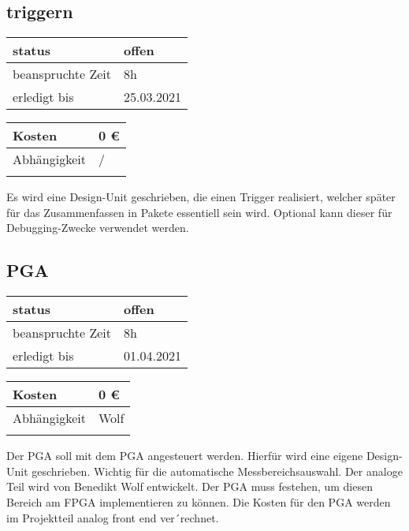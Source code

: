 \documentclass{scrartcl}
\begin{document}
\subsection{triggern}
\begin{tabular}[h]{|l|l|} %
	\hline
	status & offen\\
	\hline
	beanspruchte Zeit & 8h \\
	\hline
	erledigt bis & 25.03.2021 \\
	\hline
\end{tabular}
\begin{tabular}[h]{|l|l|} %
	\hline
	Kosten & 0 €\\
	\hline
	Abhängigkeit & /\\
	\hline
	 &  \\
	\hline
\end{tabular}
Es wird eine Design-Unit geschrieben, die einen Trigger realisiert, welcher später für das Zusammenfassen in Pakete essentiell sein wird. Optional kann dieser für Debugging-Zwecke verwendet werden. 
\subsection{PGA}
\begin{tabular}[h]{|l|l|} %
	\hline
	status & offen\\
	\hline
	beanspruchte Zeit & 8h \\
	\hline
	erledigt bis & 01.04.2021 \\
	\hline
\end{tabular}
\begin{tabular}[h]{|l|l|} %
	\hline
	Kosten & 0 €\\
	\hline
	Abhängigkeit & Wolf\\
	\hline
	 &  \\
	\hline
\end{tabular}
Der PGA soll mit dem PGA angesteuert werden. Hierfür wird eine eigene Design-Unit geschrieben. Wichtig für die automatische Messbereichsauswahl. Der analoge Teil wird von Benedikt Wolf entwickelt. Der PGA muss festehen, um diesen Bereich am FPGA implementieren zu können. Die Kosten für den PGA werden im Projektteil analog front end ver´rechnet.
\end{document}
